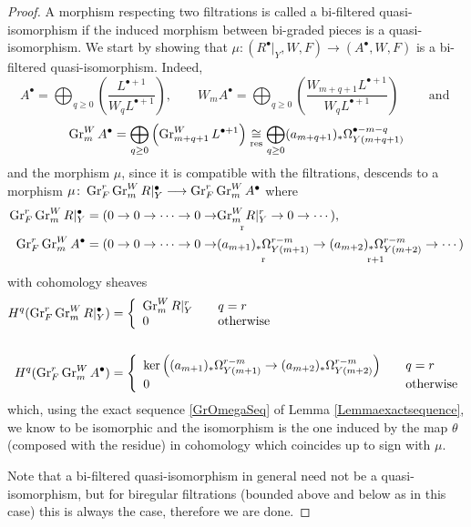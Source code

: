 \documentclass[../main.tex]{subfiles}
\begin{document}
\begin{proof}
A morphism respecting two filtrations is called a bi-filtered quasi-isomorphism if the induced morphism between bi-graded pieces is a quasi-isomorphism.
We start by showing that  $\mu \colon (R^\bullet|_Y,W, F) \to (A^\bullet,W,F)$ is a bi-filtered quasi-isomorphism.
Indeed,
\[
A^\bullet = \bigoplus_{q \geq0} \left( \frac{L^{\bullet+1}}{W_q L^{\bullet+1}} \right), \qquad 
W_mA^\bullet = \bigoplus_{q \geq0} \left( \frac{W_{m+q+1}L^{\bullet+1}}{W_q L^{\bullet+1}} \right) \qquad \text{ and }
\]
\begin{equation} \label{formulaGrA}
\operatorname{Gr}^W_mA^\bullet = \bigoplus_{q \geq0} \left( \operatorname{Gr}^W_{m+q+1} L^{\bullet+1} \right) \underset{{\operatorname{res}}}{\cong}  \bigoplus_{q \geq0}(a_{m+q+1})_* \Omega^{\bullet-m-q}_{Y(m+q+1)} 
\end{equation}
and the morphism $\mu$, since it is compatible with the filtrations, descends to a morphism $\mu \colon \operatorname{Gr}_F^r \operatorname{Gr}^W_m R|_Y^\bullet \longrightarrow \operatorname{Gr}_F^r \operatorname{Gr}^W_m A^\bullet$ where 
\begin{align*}
\operatorname{Gr}_F^r \operatorname{Gr}^W_m R|_Y^\bullet =(0 \to 0 \to \cdots \to 0 \to &\underset{\text{r}}{\operatorname{Gr}^W_m R|_Y^r} \to 0 \to \cdots), \\
\operatorname{Gr}_F^r \operatorname{Gr}^W_m A^\bullet = (0 \to 0 \to \cdots \to 0 \to &\underset{\text{r}}{(a_{m+1})_* \Omega^{r-m}_{Y(m+1)}} \to \underset{\text{r+1}}{(a_{m+2})_* \Omega^{r-m}_{Y(m+2)}} \to \cdots)
\end{align*}
with cohomology sheaves
\begin{align*}
H^q(\operatorname{Gr}_F^r \operatorname{Gr}^W_m R|_Y^\bullet) &= 
\left\{\begin{array}{ll} 
 \operatorname{Gr}^W_m R|_Y^r &\quad q = r \\ 
0 &\quad \text{otherwise}  \end{array}\right.\\ \\
H^q(\operatorname{Gr}_F^r \operatorname{Gr}^W_m A^\bullet) &= 
\left\{\begin{array}{ll} 
 \ker \left( (a_{m+1})_* \Omega^{r-m}_{Y(m+1)} \to (a_{m+2})_* \Omega^{r-m}_{Y(m+2)} \right)  &\quad q = r \\ 
0 &\quad \text{otherwise}  \end{array}\right.\\
\end{align*}
which, using the exact sequence \eqref{GrOmegaSeq} of Lemma \ref{Lemmaexactsequence}, we know to be isomorphic and the isomorphism is the one induced by the map $\theta$ (composed with the residue) in cohomology which coincides up to sign with $\mu$. 

Note that a bi-filtered quasi-isomorphism in general need not be a quasi-isomorphism, but for biregular filtrations (bounded above and below as in this case) this is always the case, therefore we are done.
\end{proof}
\end{document}
